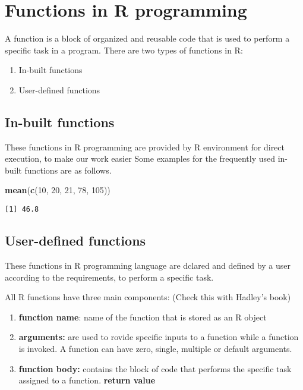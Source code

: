 \documentclass[
]{book}
\newenvironment{Shaded}{\begin{snugshade}}{\end{snugshade}}
\newcommand{\DecValTok}[1]{\textcolor[rgb]{0.00,0.00,0.81}{#1}}
\newcommand{\KeywordTok}[1]{\textcolor[rgb]{0.13,0.29,0.53}{\textbf{#1}}}
\newcommand{\NormalTok}[1]{#1}
\begin{document}
\hypertarget{functions-in-r-programming}{%
\chapter{Functions in R programming}\label{functions-in-r-programming}}

A function is a block of organized and reusable code that is used to perform a specific task in a program. There are two types of functions in R:

\begin{enumerate}
\def\labelenumi{\arabic{enumi}.}
\item
  In-built functions
\item
  User-defined functions
\end{enumerate}

\hypertarget{in-built-functions}{%
\section{In-built functions}\label{in-built-functions}}

These functions in R programming are provided by R environment for direct execution, to make our work easier Some examples for the frequently used in-built functions are as follows.

\begin{Shaded}
\begin{Highlighting}[]
\KeywordTok{mean}\NormalTok{(}\KeywordTok{c}\NormalTok{(}\DecValTok{10}\NormalTok{, }\DecValTok{20}\NormalTok{, }\DecValTok{21}\NormalTok{, }\DecValTok{78}\NormalTok{, }\DecValTok{105}\NormalTok{))}
\end{Highlighting}
\end{Shaded}

\begin{verbatim}
[1] 46.8
\end{verbatim}

\hypertarget{user-defined-functions}{%
\section{User-defined functions}\label{user-defined-functions}}

These functions in R programming language are dclared and defined by a user according to the requirements, to perform a specific task.

All R functions have three main components: (Check this with Hadley's book)

\begin{enumerate}
\def\labelenumi{\arabic{enumi}.}
\item
  \textbf{function name}: name of the function that is stored as an R object
\item
  \textbf{arguments:} are used to rovide specific inputs to a function while a function is invoked. A function can have zero, single, multiple or default arguments.
\item
  \textbf{function body:} contains the block of code that performs the specific task assigned to a function. \textbf{return value}
\end{enumerate}
\end{document}

